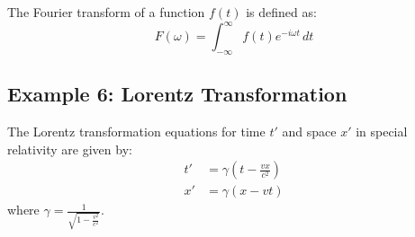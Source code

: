 \documentclass{article}
\begin{document}
    The Fourier transform of a function $f(t)$ is defined as:
    \begin{equation}
        F(\omega) = \int_{-\infty}^{\infty} f(t) e^{-i\omega t} \,dt
    \end{equation}

    \subsection*{Example 6: Lorentz Transformation}

    The Lorentz transformation equations for time $t'$ and space $x'$ in special relativity are given by:
    \begin{align}
        t' & = \gamma \left(t - \frac{vx}{c^2}\right) \\
        x' & = \gamma (x - vt)
    \end{align}
    where $\gamma = \frac{1}{\sqrt{1 - \frac{v^2}{c^2}}}$.
\end{document}

